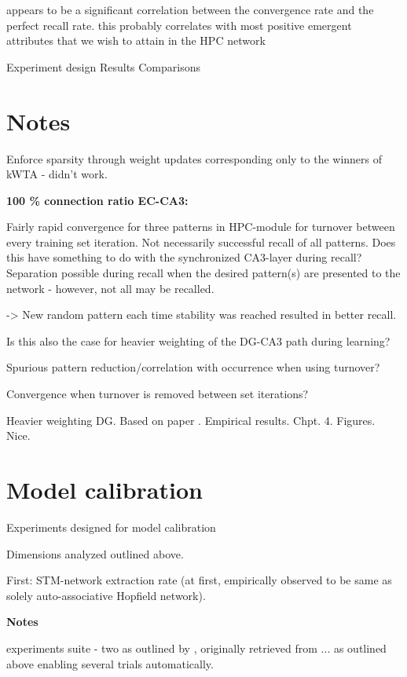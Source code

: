 appears to be a significant correlation between the convergence rate and the perfect recall rate. this probably correlates with most positive emergent attributes that we wish to attain in the HPC network


Experiment design
Results
Comparisons

\section*{Notes}

Enforce sparsity through weight updates corresponding only to the winners of kWTA - didn't work.

\textbf{100 \% connection ratio EC-CA3:}

Fairly rapid convergence for three patterns in HPC-module for turnover between every training set iteration. 
Not necessarily successful recall of all patterns. Does this have something to do with the synchronized CA3-layer during recall? Separation possible during recall when the desired pattern(s) are presented to the network - however, not all may be recalled.

-> New random pattern each time stability was reached resulted in better recall.

Is this also the case for heavier weighting of the DG-CA3 path during learning?

Spurious pattern reduction/correlation with occurrence when using turnover?

Convergence when turnover is removed between set iterations?

Heavier weighting DG. Based on paper \citep{Norman2003}. Empirical results. Chpt. 4. Figures. Nice.

\section*{Model calibration}

Experiments designed for model calibration

Dimensions analyzed outlined above.

First: STM-network extraction rate (at first, empirically observed to be same as solely auto-associative Hopfield network).


\textbf{Notes}

experiments suite - two as outlined by \citep{Hattori2014}, originally retrieved from ... as outlined above
enabling several trials automatically.

